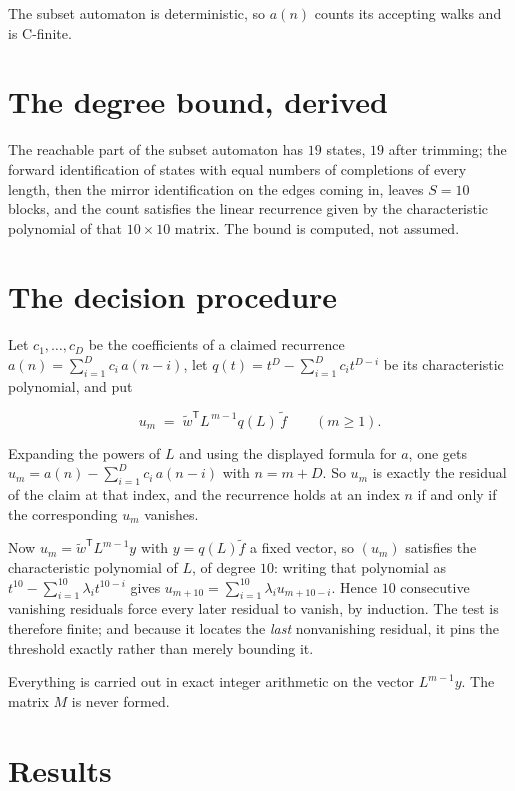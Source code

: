 \documentclass[11pt]{article}
\theoremstyle{definition}
\begin{document}
The subset automaton is deterministic, so $a(n)$ counts its accepting walks and is C-finite.

\section{The degree bound, derived}

The reachable part of the subset automaton has $19$ states, $19$ after trimming; the forward identification of states with equal numbers of completions of every length, then the mirror identification on the edges coming in, leaves $S = 10$ blocks, and the count satisfies the linear recurrence given by the characteristic polynomial of that $10\times10$ matrix. The bound is computed, not assumed.

\section{The decision procedure}

Let $c_1,\dots,c_D$ be the coefficients of a claimed recurrence $a(n) = \sum_{i=1}^{D} c_i\,a(n-i)$, let $q(t) = t^{D} - \sum_{i=1}^{D} c_i t^{D-i}$ be its characteristic polynomial, and put

\[u_m \;=\; \tilde w^{\mathsf T} L^{\,m-1} q(L)\,\tilde f \qquad (m \ge 1).\]

Expanding the powers of $L$ and using the displayed formula for $a$, one gets $u_m = a(n) - \sum_{i=1}^{D} c_i\,a(n-i)$ with $n = m + D$. So $u_m$ is exactly the residual of the claim at that index, and the recurrence holds at an index $n$ if and only if the corresponding $u_m$ vanishes.

Now $u_m = \tilde w^{\mathsf T} L^{m-1} y$ with $y = q(L)\tilde f$ a fixed vector, so $(u_m)$ satisfies the characteristic polynomial of $L$, of degree $10$: writing that polynomial as $t^{10} - \sum_{i=1}^{10} \lambda_i t^{10-i}$ gives $u_{m+10} = \sum_{i=1}^{10} \lambda_i u_{m+10-i}$. Hence $10$ consecutive vanishing residuals force every later residual to vanish, by induction. The test is therefore finite; and because it locates the {\itshape last} nonvanishing residual, it pins the threshold exactly rather than merely bounding it.

Everything is carried out in exact integer arithmetic on the vector $L^{m-1}y$. The matrix $M$ is never formed.

\section{Results}
\end{document}
